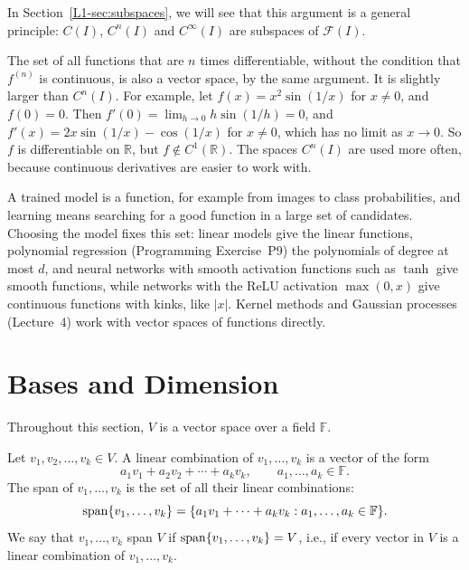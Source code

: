 In Section~\ref{L1-sec:subspaces}, we will see that this argument is a general principle: $C(I)$, $C^n(I)$ and $C^\infty(I)$ are subspaces of $\mathcal{F}(I)$.

\begin{remark}
    The set of all functions that are $n$ times differentiable, without the condition that $f^{(n)}$ is continuous, is also a vector space, by the same argument. It is slightly larger than $C^n(I)$. For example, let $f(x) = x^2\sin(1/x)$ for $x \neq 0$, and $f(0) = 0$. Then $f'(0) = \lim_{h \to 0} h\sin(1/h) = 0$, and $f'(x) = 2x\sin(1/x) - \cos(1/x)$ for $x \neq 0$, which has no limit as $x \to 0$. So $f$ is differentiable on $\mathbb{R}$, but $f \notin C^1(\mathbb{R})$. The spaces $C^n(I)$ are used more often, because continuous derivatives are easier to work with.
\end{remark}

\begin{remark}
    A trained model is a function, for example from images to class probabilities, and learning means searching for a good function in a large set of candidates. Choosing the model fixes this set: linear models give the linear functions, polynomial regression (Programming Exercise~P9) the polynomials of degree at most $d$, and neural networks with smooth activation functions such as $\tanh$ give smooth functions, while networks with the ReLU activation $\max(0, x)$ give continuous functions with kinks, like $|x|$. Kernel methods and Gaussian processes (Lecture~4) work with vector spaces of functions directly.
\end{remark}

\section{Bases and Dimension}

Throughout this section, $V$ is a vector space over a field $\mathbb{F}$.

\begin{definition}
    Let $v_1, v_2, \ldots, v_k \in V$. A linear combination of $v_1, \ldots, v_k$ is a vector of the form
    \[a_1 v_1 + a_2 v_2 + \cdots + a_k v_k, \qquad a_1, \ldots, a_k \in \mathbb{F}.\]
    The span of $v_1, \ldots, v_k$ is the set of all their linear combinations:
    \[\operatorname{span}\{v_1, \ldots, v_k\} = \{a_1 v_1 + \cdots + a_k v_k : a_1, \ldots, a_k \in \mathbb{F}\}.\]
    We say that $v_1, \ldots, v_k$ span $V$ if $\operatorname{span}\{v_1, \ldots, v_k\} = V$, i.e., if every vector in $V$ is a linear combination of $v_1, \ldots, v_k$.
\end{definition}

